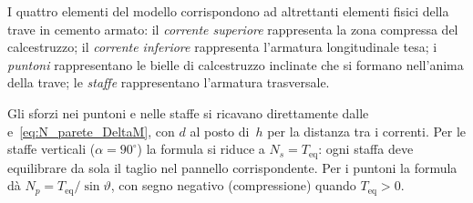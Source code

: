 I quattro elementi del modello corrispondono ad
altrettanti elementi fisici della trave in cemento
armato: il \emph{corrente superiore} rappresenta
la zona compressa del calcestruzzo; il
\emph{corrente inferiore} rappresenta l'armatura
longitudinale tesa; i \emph{puntoni} rappresentano
le bielle di calcestruzzo inclinate che si formano
nell'anima della trave; le \emph{staffe} rappresentano
l'armatura trasversale.

Gli sforzi nei puntoni e nelle staffe si ricavano
direttamente dalle~
e~\eqref{eq:N_parete_DeltaM}, con $d$ al posto
di~$h$ per la distanza tra i correnti.
Per le staffe verticali ($\alpha = 90^\circ$) la
formula si riduce a $N_s = T_\text{eq}$: ogni staffa
deve equilibrare da sola il taglio nel pannello
corrispondente. Per i puntoni la formula dà
$N_p = T_\text{eq}/\sin\vartheta$, con segno
negativo (compressione) quando $T_\text{eq} > 0$.


